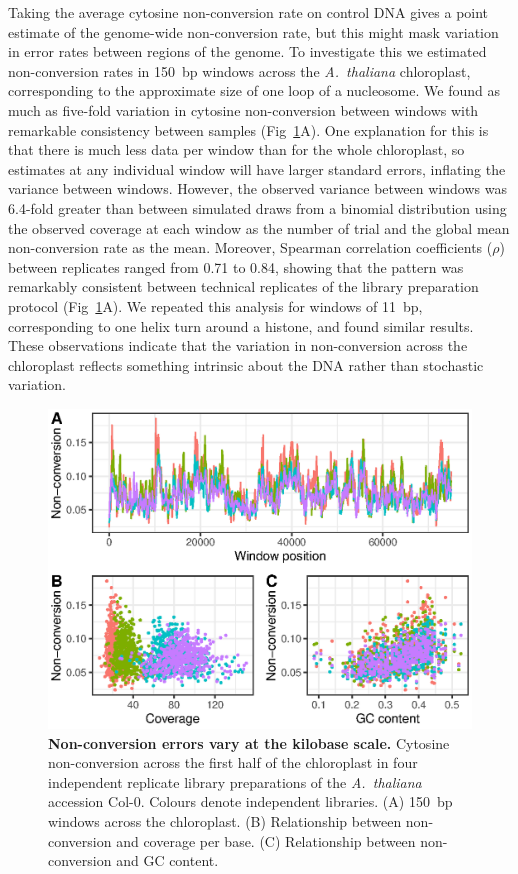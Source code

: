 \documentclass[10pt,letterpaper,draft]{article}
\begin{document}
Taking the average cytosine non-conversion rate on control DNA gives a point estimate of the genome-wide non-conversion rate, but this might mask variation in error rates between regions of the genome.
To investigate this we estimated non-conversion rates in 150~bp windows across the \emph{A.~thaliana} chloroplast, corresponding to the approximate size of one loop of a nucleosome.
We found as much as five-fold variation in cytosine non-conversion between windows with remarkable consistency between samples (Fig~\ref{fig:uncertainty}A).
One explanation for this is that there is much less data per window than for the whole chloroplast, so estimates at any individual window will have larger standard errors, inflating the variance between windows.
However, the observed variance between windows was 6.4-fold greater than between simulated draws from a binomial distribution using the observed coverage at each window as the number of trial and the global mean non-conversion rate as the mean.
Moreover, Spearman correlation coefficients ($\rho$) between replicates ranged from 0.71 to 0.84, showing that the pattern was remarkably consistent between technical replicates of the library preparation protocol (Fig~\ref{fig:uncertainty}A).
We repeated this analysis for windows of 11~bp, corresponding to one helix turn around a histone, and found similar results.
These observations indicate that the variation in non-conversion across the chloroplast reflects something intrinsic about the DNA rather than stochastic variation.

\begin{figure}
  \begin{center}
    \includegraphics{figure2.eps}
    \caption{
        {\bf Non-conversion errors vary at the kilobase scale.}
        Cytosine non-conversion across the first half of the chloroplast in four independent replicate library preparations of the \emph{A.~thaliana} accession Col-0.
        Colours denote independent libraries.
        (A) 150~bp windows across the chloroplast.
        (B) Relationship between non-conversion and coverage per base.
        (C) Relationship between non-conversion and GC content.
    }
    \label{fig:uncertainty}
  \end{center}
\end{figure}
\end{document}
